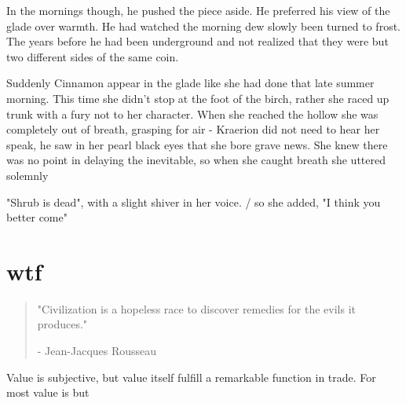 \documentclass[smalldemyvopaper,11pt,twoside,onecolumn,openright,extrafontsizes]{memoir}
\begin{document}
In the mornings though, he pushed the piece aside. He preferred his view of the glade over warmth. He had watched the morning dew slowly been turned to frost. The years before he had been underground and not realized that they were but two different sides of the same coin. 

Suddenly Cinnamon appear in the glade like she had done that late summer morning. This time she didn't stop at the foot of the birch, rather she raced up trunk with a fury not to her character. When she reached the hollow she was completely out of breath, grasping for air - Kraerion did not need to hear her speak, he saw in her pearl black eyes that she bore grave news. She knew there was no point in delaying the inevitable, so when she caught breath she uttered solemnly 

"Shrub is dead", with a slight shiver in her voice. / so she added, "I think you better come" 


\chapter{wtf}

\vspace{-1.3cm}
\begin{localsize}{10}
	\begin{quote}
		"Civilization is a hopeless race to discover remedies for the evils it produces."
		\begin{flushright}- Jean-Jacques Rousseau\end{flushright}
	\end{quote} 
\end{localsize}
\vspace{1cm}




Value is subjective, but value itself fulfill a remarkable function in trade. For most value is but 
\end{document}
